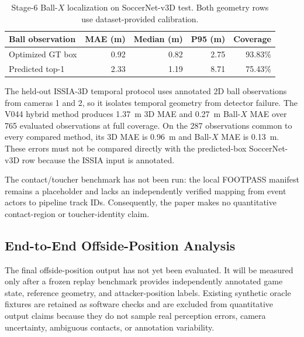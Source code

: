 \documentclass[runningheads]{llncs}
\begin{document}
\begin{table}[H]
\centering
\caption{Stage-6 Ball-$X$ localization on SoccerNet-v3D test. Both geometry rows use dataset-provided calibration.}
\label{tab:ball_results}
\small
\begin{tabular}{lrrrr}
\toprule
Ball observation & MAE (m) & Median (m) & P95 (m) & Coverage \\
\midrule
Optimized GT box & 0.92 & 0.82 & 2.75 & 93.83\% \\
Predicted top-1 & 2.33 & 1.19 & 8.71 & 75.43\% \\
\bottomrule
\end{tabular}
\end{table}

The held-out ISSIA-3D temporal protocol uses annotated 2D ball observations from cameras 1 and 2, so it isolates temporal geometry from detector failure. The V044 hybrid method produces 1.37~m 3D MAE and 0.27~m Ball-$X$ MAE over 765 evaluated observations at full coverage. On the 287 observations common to every compared method, its 3D MAE is 0.96~m and Ball-$X$ MAE is 0.13~m. These errors must not be compared directly with the predicted-box SoccerNet-v3D row because the ISSIA input is annotated.

The contact/toucher benchmark has not been run: the local FOOTPASS manifest remains a placeholder and lacks an independently verified mapping from event actors to pipeline track IDs. Consequently, the paper makes no quantitative contact-region or toucher-identity claim.

\subsection{End-to-End Offside-Position Analysis}
\label{subsec:results_e2e}
The final offside-position output has not yet been evaluated. It will be measured only after a frozen replay benchmark provides independently annotated game state, reference geometry, and attacker-position labels. Existing synthetic oracle fixtures are retained as software checks and are excluded from quantitative output claims because they do not sample real perception errors, camera uncertainty, ambiguous contacts, or annotation variability.
\end{document}

